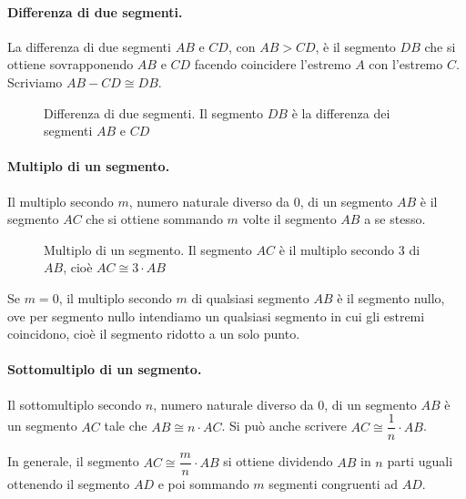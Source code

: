 \paragraph{Differenza di due segmenti.} La differenza di due segmenti 
$AB$ e $CD$, con $AB>CD$, è il segmento $DB$ che si ottiene 
sovrapponendo $AB$ e $CD$ facendo coincidere l'estremo $A$ con 
l'estremo $C$. Scriviamo $AB-CD \cong DB$.


\begin{inaccessibleblock}
 \begin{figure}[htb]
\centering
\caption{Differenza di due segmenti. Il segmento $DB$ è la differenza 
dei segmenti $AB$ e $CD$}
\end{figure}
\end{inaccessibleblock}

\paragraph{Multiplo di un segmento.} Il multiplo secondo $m$, numero 
naturale diverso da 0, di un segmento $AB$ è il segmento $AC$ che si 
ottiene sommando $m$ volte il segmento $AB$ a se stesso.


\begin{inaccessibleblock}
 \begin{figure}[htb]
\centering
\caption{Multiplo di un segmento. Il segmento $AC$ è il multiplo 
secondo 3 di $AB$, cioè $AC\cong 3\cdot AB$}
\end{figure}
\end{inaccessibleblock}

Se $m=0$, il multiplo secondo $m$ di qualsiasi segmento $AB$ è il 
segmento nullo, ove per segmento nullo intendiamo un qualsiasi 
segmento in cui gli estremi coincidono, cioè il segmento ridotto a un 
solo punto.

\paragraph{Sottomultiplo di un segmento.} Il sottomultiplo secondo 
$n$, numero naturale diverso da 0, di un segmento $AB$ è un segmento 
$AC$ tale che $AB\cong n\cdot AC$. Si può anche scrivere $AC \cong 
\dfrac{1}{n}\cdot AB$.

In generale, il segmento $AC\cong\dfrac{m}{n}\cdot AB$ si ottiene 
dividendo $AB$ in $n$ parti uguali ottenendo il segmento $AD$ e poi 
sommando $m$ segmenti congruenti ad $AD$.


